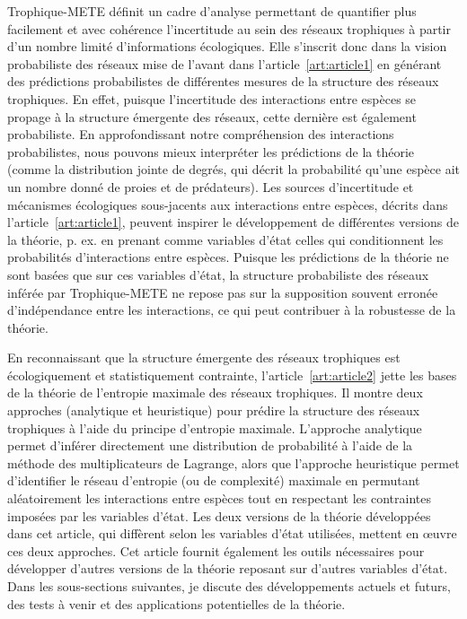 Trophique-METE définit un cadre d'analyse permettant de quantifier plus
facilement et avec cohérence l'incertitude au sein des réseaux trophiques à
partir d'un nombre limité d'informations écologiques. Elle s'inscrit donc dans
la vision probabiliste des réseaux mise de l'avant dans
l'article~\ref{art:article1} en générant des prédictions probabilistes de
différentes mesures de la structure des réseaux trophiques. En effet, puisque
l'incertitude des interactions entre espèces se propage à la structure émergente
des réseaux, cette dernière est également probabiliste. En approfondissant notre
compréhension des interactions probabilistes, nous pouvons mieux interpréter les
prédictions de la théorie (comme la distribution jointe de degrés, qui décrit la
probabilité qu'une espèce ait un nombre donné de proies et de prédateurs). Les
sources d'incertitude et mécanismes écologiques sous-jacents aux interactions
entre espèces, décrits dans l'article~\ref{art:article1}, peuvent inspirer le
développement de différentes versions de la théorie, p. ex. en prenant comme
variables d'état celles qui conditionnent les probabilités d'interactions entre
espèces. Puisque les prédictions de la théorie ne sont basées que sur ces
variables d'état, la structure probabiliste des réseaux inférée par
Trophique-METE ne repose pas sur la supposition souvent erronée d'indépendance
entre les interactions, ce qui peut contribuer à la robustesse de la théorie.

En reconnaissant que la structure émergente des réseaux trophiques est
écologiquement et statistiquement contrainte, l'article~\ref{art:article2} jette
les bases de la théorie de l'entropie maximale des réseaux trophiques. Il montre
deux approches (analytique et heuristique) pour prédire la structure des réseaux
trophiques à l'aide du principe d'entropie maximale. L'approche analytique
permet d'inférer directement une distribution de probabilité à l'aide de la
méthode des multiplicateurs de Lagrange, alors que l'approche heuristique permet
d'identifier le réseau d'entropie (ou de complexité) maximale en permutant
aléatoirement les interactions entre espèces tout en respectant les contraintes
imposées par les variables d'état. Les deux versions de la théorie développées
dans cet article, qui diffèrent selon les variables d'état utilisées, mettent en
œuvre ces deux approches. Cet article fournit également les outils nécessaires
pour développer d'autres versions de la théorie reposant sur d'autres variables
d'état. Dans les sous-sections suivantes, je discute des développements actuels
et futurs, des tests à venir et des applications potentielles de la théorie. 

